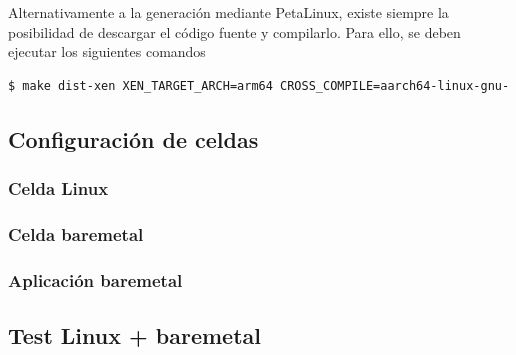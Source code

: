 Alternativamente a la generación mediante PetaLinux, existe siempre la posibilidad de descargar el código fuente y compilarlo. Para ello, se deben ejecutar los siguientes comandos \cite{xen_source_xilinx}

\begin{lstlisting}[style=CStyle]
$ make dist-xen XEN_TARGET_ARCH=arm64 CROSS_COMPILE=aarch64-linux-gnu-
\end{lstlisting}

\subsection{Configuración de celdas}
\subsubsection{Celda Linux}
\subsubsection{Celda baremetal}
\subsubsection{Aplicación baremetal}

\subsection{Test Linux + baremetal}
